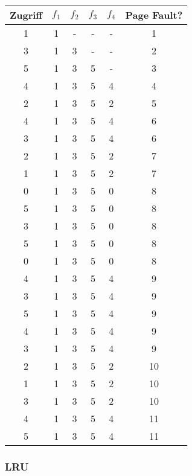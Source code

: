 \documentclass[10pt,a4paper]{article}
\begin{document}
\begin{tabular}{c|c|c|c|c|c}
  Zugriff & $f_{1}$ & $f_{2}$ & $f_{3}$ & $f_{4}$ & Page Fault?\\\hline
  1 & 1 & - & - & - & 1\\
  3 & 1 & 3 & - & - & 2\\
  5 & 1 & 3 & 5 & - & 3\\
  4 & 1 & 3 & 5 & 4 & 4\\
  2 & 1 & 3 & 5 & 2 & 5\\
  4 & 1 & 3 & 5 & 4 & 6\\
  3 & 1 & 3 & 5 & 4 & 6\\
  2 & 1 & 3 & 5 & 2 & 7\\
  1 & 1 & 3 & 5 & 2 & 7\\
  0 & 1 & 3 & 5 & 0 & 8\\
  5 & 1 & 3 & 5 & 0 & 8\\
  3 & 1 & 3 & 5 & 0 & 8\\
  5 & 1 & 3 & 5 & 0 & 8\\
  0 & 1 & 3 & 5 & 0 & 8\\
  4 & 1 & 3 & 5 & 4 & 9\\
  3 & 1 & 3 & 5 & 4 & 9\\
  5 & 1 & 3 & 5 & 4 & 9\\
  4 & 1 & 3 & 5 & 4 & 9\\
  3 & 1 & 3 & 5 & 4 & 9\\
  2 & 1 & 3 & 5 & 2 & 10\\
  1 & 1 & 3 & 5 & 2 & 10\\
  3 & 1 & 3 & 5 & 2 & 10\\
  4 & 1 & 3 & 5 & 4 & 11\\
  5 & 1 & 3 & 5 & 4 & 11
\end{tabular}

\subsubsection*{LRU}
\end{document}
